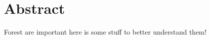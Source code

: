 \chapter*{\centering \Large \vspace{-20mm}\Huge Abstract}


Forest are important here is some stuff to better understand them!
